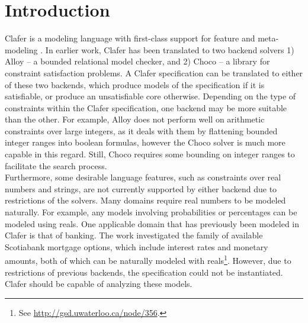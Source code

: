 \documentclass{easychair}
\begin{document}
\setcounter{tocdepth}{2}
{\small
\tableofcontents}

%
%

\pagestyle{empty}


\section{Introduction}
Clafer is a modeling language with first-class support for feature and meta-modeling \cite{BakClafer}. In earlier work, Clafer has been translated to two backend solvers 1) Alloy -- a bounded relational model checker, and 2) Choco -- a library for constraint satisfaction problems. A Clafer specification can be translated to either of these two backends, which produce models of the specification if it is satisfiable, or produce an unsatisfiable core otherwise. Depending on the type of constraints within the Clafer specification, one backend may be more suitable than the other. For example, Alloy does not perform well on arithmetic constraints over large integers, as it deals with them by flattening bounded integer ranges into boolean formulas, however the Choco solver is much more capable in this regard. Still, Choco requires some bounding on integer ranges to facilitate the search process.\\
\indent Furthermore, some desirable language features, such as constraints over real numbers and strings, are not currently supported by either backend due to restrictions of the solvers. Many domains require real numbers to be modeled naturally. For example, any models involving probabilities or percentages can be modeled using reals. One applicable domain that has previously been modeled in Clafer is that of banking. The work investigated the family of available Scotiabank mortgage options, which include interest rates and monetary amounts, both of which can be naturally modeled with reals\footnote{See \url{http://gsd.uwaterloo.ca/node/356}.}. However, due to restrictions of previous backends, the specification could not be instantiated. Clafer should be capable of analyzing these models. \\
\end{document}
